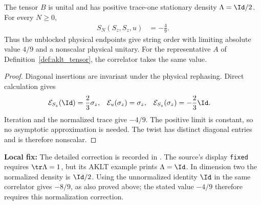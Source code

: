 \begin{lemma}
    \label{thm:aklt_physical_string_order_value}
    \leanok
    The tensor $B$ is unital and has positive trace-one stationary density
    $\Lambda=\Id/2$. For every $N\geq0$,
    \begin{align}
        S_N(S_z,S_z,u) & =-\frac49.
        \label{eq:aklt_physical_string_order_value}
    \end{align}
    Thus the unblocked physical endpoints give string order with
    limiting absolute value $4/9$ and a nonscalar physical unitary.
    For the representative $A$ of Definition~\ref{def:aklt_tensor}, the
    correlator takes the same value.
\end{lemma}
\begin{proof}\leanok
    Diagonal insertions are invariant under the physical rephasing. Direct
    calculation gives
    \begin{align}
        \mathcal E_{S_z}(\Id)      & =\frac23\sigma_z, &
        \mathcal E_u(\sigma_z)     & =\sigma_z,        &
        \mathcal E_{S_z}(\sigma_z) & =-\frac23\Id.
        \notag
    \end{align}
    Iteration and the normalized trace give $-4/9$. The positive limit is
    constant, so no asymptotic approximation is needed. The twist has
    distinct diagonal entries and is therefore nonscalar.
\end{proof}

\begin{remark}[Normalization in the printed AKLT example]
    \textbf{Local fix:} The detailed correction is recorded in
    .
    The source's display \texttt{fixed} requires $\tr\Lambda=1$, but its
    AKLT example prints $\Lambda=\Id$. In dimension two the normalized
    density is $\Id/2$. Using the unnormalized identity $\Id$ in the same correlator
    gives $-8/9$, as also proved above; the stated value $-4/9$ therefore
    requires this normalization correction.
\end{remark}

